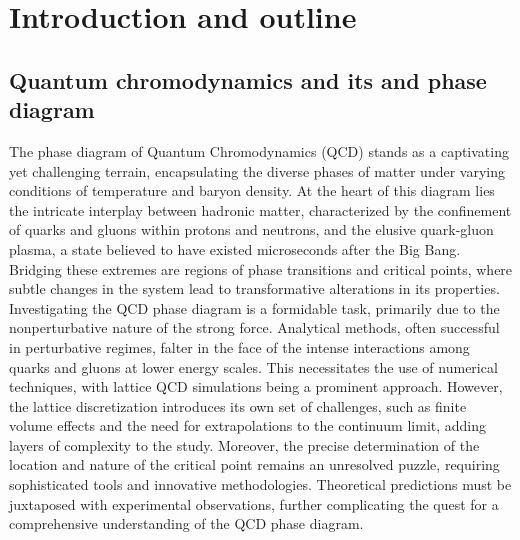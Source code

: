 \chapter{Introduction and outline}
\label{chap:introduction}

\section{Quantum chromodynamics and its and phase diagram}
The phase diagram of Quantum Chromodynamics (QCD) stands as a captivating yet challenging terrain, encapsulating the diverse phases of matter under varying conditions of temperature and baryon density. At the heart of this diagram lies the intricate interplay between hadronic matter, characterized by the confinement of quarks and gluons within protons and neutrons, and the elusive quark-gluon plasma, a state believed to have existed microseconds after the Big Bang. Bridging these extremes are regions of phase transitions and critical points, where subtle changes in the system lead to transformative alterations in its properties.
Investigating the QCD phase diagram is a formidable task, primarily due to the nonperturbative nature of the strong force. Analytical methods, often successful in perturbative regimes, falter in the face of the intense interactions among quarks and gluons at lower energy scales. This necessitates the use of numerical techniques, with lattice QCD simulations being a prominent approach. However, the lattice discretization introduces its own set of challenges, such as finite volume effects and the need for extrapolations to the continuum limit, adding layers of complexity to the study.
Moreover, the precise determination of the location and nature of the critical point remains an unresolved puzzle, requiring sophisticated tools and innovative methodologies. Theoretical predictions must be juxtaposed with experimental observations, further complicating the quest for a comprehensive understanding of the QCD phase diagram.
